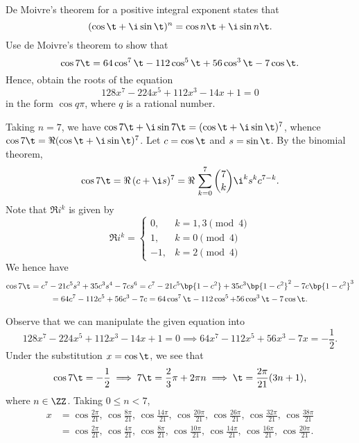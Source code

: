 \begin{problem}
    De Moivre's theorem for a positive integral exponent states that \[(\cos\t + \i\sin\t)^n = \cos n\t + \i\sin n\t.\] Use de Moivre's theorem to show that \[\cos 7\t = 64 \cos^7 \t - 112 \cos^5 \t + 56 \cos^3 \t - 7 \cos \t.\] Hence, obtain the roots of the equation \[128x^7 - 224x^5 + 112x^3 - 14x + 1 = 0\] in the form $\cos q\pi$, where $q$ is a rational number.
\end{problem}
\begin{solution}
    Taking $n = 7$, we have $\cos 7\t + \i\sin 7\t = (\cos\t + \i\sin\t)^7$, whence $\cos 7\t = \Re (\cos \t + \i\sin \t)^7$. Let $c = \cos \t$ and $s = \sin \t$. By the binomial theorem,  \[\cos 7\t = \Re \, (c + \i s)^7 = \Re \, \sum_{k = 0}^7 \binom{7}{k} \i^k s^k c^{7-k}.\] Note that $\Re i^k$ is given by \[
        \Re i^k = \begin{cases}
            0, &k = 1, 3 \pmod{4}\\
            1, &k = 0 \pmod{4}\\
            -1, &k = 2 \pmod{4}
    \end{cases}\] We hence have
    \begin{gather*}
        \cos 7\t = c^7 - 21c^5s^2 + 35c^3s^4 - 7cs^6 = c^7 - 21c^5\bp{1-c^2} + 35c^3\bp{1 - c^2}^2 - 7c\bp{1 - c^2}^3\\
        = 64c^7 - 112c^5 + 56c^3 - 7c = 64\cos^7\t - 112\cos^5 + 56 \cos^3\t - 7\cos\t.
    \end{gather*}

    Observe that we can manipulate the given equation into \[128x^7 - 224x^5 + 112x^3 - 14x + 1 = 0 \implies 64x^7 - 112x^5 + 56x^3 - 7x = -\frac12.\] Under the substitution $x = \cos \t$, we see that \[\cos 7\t = -\frac12 \implies 7\t = \frac23 \pi + 2\pi n \implies \t = \frac{2\pi}{21} (3n + 1),\] where $n \in \ZZ$. Taking $0 \leq n < 7$,
    \begin{align*}
        x &= \cos \frac{2\pi}{21}, \, \cos \frac{8\pi}{21}, \, \cos \frac{14\pi}{21}, \, \cos \frac{20\pi}{21}, \, \cos \frac{26\pi}{21}, \, \cos \frac{32\pi}{21}, \, \cos \frac{38\pi}{21}\\
        &= \cos \frac{2\pi}{21}, \, \cos \frac{4\pi}{21}, \, \cos \frac{8\pi}{21}, \, \cos \frac{10\pi}{21}, \, \cos \frac{14\pi}{21}, \, \cos \frac{16\pi}{21}, \, \cos \frac{20\pi}{21}.
    \end{align*}
\end{solution}

